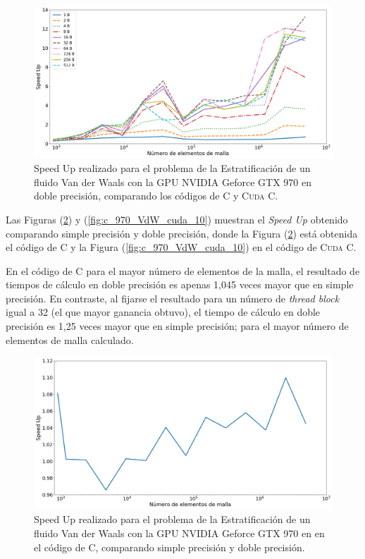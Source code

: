 \begin{figure}[htbp]
	\centering
	\includegraphics[width=\textwidth]{figs/cap4/s_970_VdW_double_10}
	\caption{Speed Up realizado para el problema de la Estratificación de un fluido Van der Waals con la GPU NVIDIA Geforce GTX 970 en doble precisión, comparando los códigos de \textsc{C} y \textsc{Cuda C}.} 
	\label{fig:s_970_VdW_double_10}	
\end{figure}

\newpage

Las Figuras (\ref{fig:c_970_VdW_c_10}) y (\ref{fig:c_970_VdW_cuda_10}) muestran el \textit{Speed Up} obtenido comparando simple precisión y doble precisión, donde la Figura (\ref{fig:c_970_VdW_c_10}) está obtenida el código de \textsc{C} y la Figura (\ref{fig:c_970_VdW_cuda_10}) en el código de \textsc{Cuda C}. 

En el código de \textsc{C} para el mayor número de elementos de la malla, el resultado de tiempos de cálculo en doble precisión es apenas 1,045 veces mayor que en  simple precisión. En contraste, al fijarse el resultado para un número de \textit{thread block} igual a 32 (el que mayor ganancia obtuvo), el tiempo de cálculo en doble precisión es 1,25 veces mayor que en simple precisión; para el mayor número de elementos de malla calculado.

\begin{figure}[h!]
	\centering
	\includegraphics[width=\textwidth]{figs/cap4/c_970_VdW_c_10}
	\caption{Speed Up realizado para el problema de la Estratificación de un fluido Van der Waals con la GPU NVIDIA Geforce GTX 970 en en el código de \textsc{C}, comparando simple precisión y doble precisión.} 
	\label{fig:c_970_VdW_c_10}	
\end{figure}

